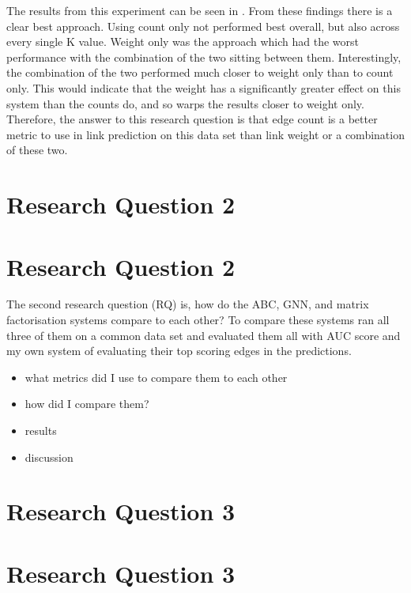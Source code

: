 \documentclass{l4proj}
\begin{document}
The results from this experiment can be seen in . From these findings there is a clear best approach. Using count only not performed best overall, but also across every single K value. Weight only was the approach which had the worst performance with the combination of the two sitting between them. Interestingly, the combination of the two performed much closer to weight only than to count only. This would indicate that the weight has a significantly greater effect on this system than the counts do, and so warps the results closer to weight only. \\ 

Therefore, the answer to this research question is that edge count is a better metric to use in link prediction on this data set than link weight or a combination of these two. \\

\section{Research Question 2}

\section{Research Question 2}

The second research question (RQ) is, how do the ABC, GNN, and matrix factorisation systems compare to each other? To compare these systems ran all three of them on a common data set and evaluated them all with AUC score and my own system of evaluating their top scoring edges in the predictions. \\

\begin{itemize}
    \item what metrics did I use to compare them to each other
    \item how did I compare them?
    \item results
    \item discussion
\end{itemize}

\section{Research Question 3}

\section{Research Question 3}
\end{document}
